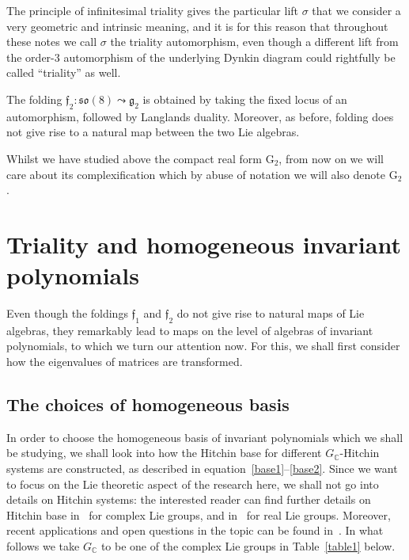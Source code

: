 \documentclass[pdftex]{sigma}
\numberwithin{equation}{section}
\begin{document}
\begin{Remark}
The principle of infinitesimal triality gives the particular lift $\sigma$ that we consider a very geometric and intrinsic meaning, and it is for this reason that throughout these notes we call $\sigma$ the triality automorphism, even though a different lift from the order-3 automorphism of the underlying Dynkin diagram could rightfully be called ``triality'' as well.
\end{Remark}

\begin{Remark}The folding $\mathfrak{f}_2\colon \mathfrak{so}(8) \leadsto \mathfrak{g}_2$ is obtained by taking the fixed locus of an automorphism, followed by Langlands duality. Moreover, as before, folding does not give rise to a natural map between the two Lie algebras.\end{Remark}

Whilst we have studied above the compact real form $\mathrm{G}_2$, from now on we will care about its complexification which by abuse of notation we will also denote $\mathrm{G}_2$.

\section{Triality and homogeneous invariant polynomials}\label{tri:higgs} Even though the foldings $\mathfrak{f}_1$ and $\mathfrak{f}_2$ do not give rise to natural maps of Lie algebras, they remarkably lead to maps on the level of algebras of invariant polynomials, to which we turn our attention now. For this, we shall first consider how the eigenvalues of matrices are transformed.


\subsection{The choices of homogeneous basis} In order to choose the homogeneous basis of invariant polynomials which we shall be studying, we shall look into how the Hitchin base for different $G_\mathbb{C}$-Hitchin systems are constructed, as described in equation~\eqref{base1}--\eqref{base2}. Since we want to focus on the Lie theoretic aspect of the research here, we shall not go into details on Hitchin systems: the interested reader can find further details on Hitchin base in~\cite{N2} for complex Lie groups, and in~\cite{thesis} for real Lie groups. Moreover, recent applications and open questions in the topic can be found in~\cite{notices}.
 In what follows we take $G_\mathbb{C}$ to be one of the complex Lie groups in Table~\ref{table1} below.
\end{document}
